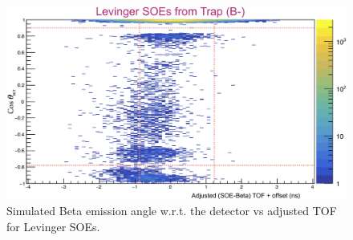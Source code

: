 \begin{figure}[h!tb]
	\centering
	\includegraphics[width=.999\linewidth]
	{Figures/fig_2D_SOE_TOF_Lev.png}
	\caption[Simulated Beta emission angle w.r.t. the detector vs adjusted Levinger SOE TOF]{Simulated Beta emission angle w.r.t. the detector vs adjusted TOF for Levinger SOEs.  %
	}	
	\label{fig:soe_tof_vs_costheta_levinger}
\end{figure}
